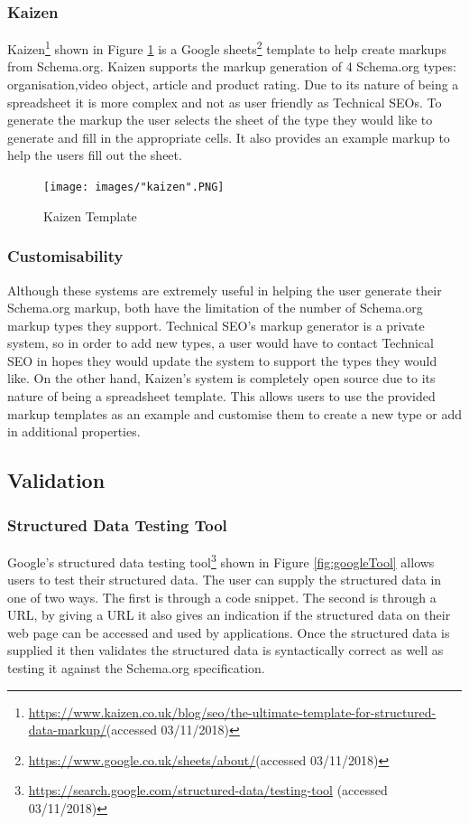 \subsubsection*{Kaizen}\label{sec:kaizen}
{
Kaizen\footnote{\url{https://www.kaizen.co.uk/blog/seo/the-ultimate-template-for-structured-data-markup/}(accessed 03/11/2018)} shown in Figure \ref{fig:kaizen} is a Google sheets\footnote{\url{https://www.google.co.uk/sheets/about/}(accessed 03/11/2018)} template to help create markups from Schema.org. Kaizen supports the markup generation of 4 Schema.org types: organisation,video object, article and product rating. Due to its nature of being a spreadsheet it is more complex and not as user friendly as Technical SEOs. To generate the markup the user selects the sheet of the type they would like to generate and fill in the appropriate cells. It also provides an example markup to help the users fill out the sheet.\newline

\begin{figure}[h!]
 \centering\texttt{[image: images/"kaizen".PNG]}
   \caption{Kaizen Template}
   \label{fig:kaizen}
\end{figure}

\subsubsection*{Customisability}\label{sec:customisability}
Although these systems are extremely useful in helping the user generate their Schema.org markup, both have the limitation of the number of Schema.org markup types they support. Technical SEO's markup generator is a private system, so in order to add new types, a user would have to contact Technical SEO in hopes they would update the system to support the types they would like. On the other hand, Kaizen's system is completely open source due to its nature of being a spreadsheet template. This allows users to use the provided markup templates as an example and customise them to create a new type or add in additional properties.

}

\subsection{Validation}
\subsubsection*{Structured Data Testing Tool}
Google's structured data testing tool\footnote{\url{https://search.google.com/structured-data/testing-tool} (accessed 03/11/2018)} shown in Figure \ref{fig:googleTool} allows users to test their structured data. The user can supply the structured data in one of two ways. The first is through a code snippet. The second is through a URL, by giving a URL it also gives an indication if the structured data on their web page can be accessed and used by applications. Once the structured data is supplied it then validates the structured data is syntactically correct as well as testing it against the Schema.org specification.\newline


